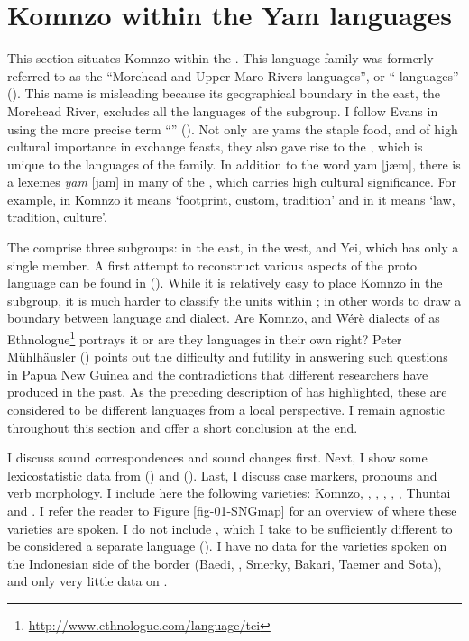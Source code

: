 \section{Komnzo within the Yam languages}\label{Komnzowithinyam}

This section situates Komnzo within the . This language family was formerly referred to as the ``Morehead and Upper Maro Rivers languages'', or `` languages'' (\citealt{Wurm:1971uw}). This name is misleading because its geographical boundary in the east, the Morehead River, excludes all the languages of the  subgroup. I follow Evans in using the more precise term ``'' (\citeyear[124]{Evans:2012wp}). Not only are yams the staple food, and of high cultural importance in exchange feasts, they also gave rise to the  , which is unique to the languages of the family. In addition to the  word yam [jæm], there is a lexemes \emph{yam} [jam] in many of the , which carries high cultural significance. For example, in Komnzo it means `footprint, custom, tradition' and in  it means `law, tradition, culture'.

The  comprise three subgroups:  in the east,  in the west, and Yei, which has only a single member. A first attempt to reconstruct various aspects of the proto language can be found in (\citealt{Evans:sng}). While it is relatively easy to place Komnzo in the  subgroup, it is much harder to classify the units within ; in other words to draw a boundary between language and dialect. Are Komnzo,  and Wérè dialects of  as Ethnologue\footnote{\url{http://www.ethnologue.com/language/tci}} portrays it or are they languages in their own right? Peter Mühlhäusler (\citeyear{Muhlhausler:2006naming}) points out the difficulty and futility in answering such questions in Papua New Guinea and the contradictions that different researchers have produced in the past. As the preceding description of  has highlighted, these are considered to be different languages from a local perspective. I remain agnostic throughout this section and offer a short conclusion at the end.

I discuss sound correspondences and sound changes first. Next, I show some lexicostatistic data from (\citealt{Wurm:1971uw}) and (\citealt{Clifton:1991fly}). Last, I discuss case markers, pronouns and verb morphology. I include here the following  varieties: Komnzo, , , , , ,  Thuntai and . I refer the reader to Figure \ref{fig-01-SNGmap} for an overview of where these varieties are spoken. I do not include , which I take to be sufficiently different to be considered a separate language (\citealt{Bouve:2003ar}). I have no data for the  varieties spoken on the Indonesian side of the border (Baedi, , Smerky, Bakari, Taemer and Sota), and only very little data on .

